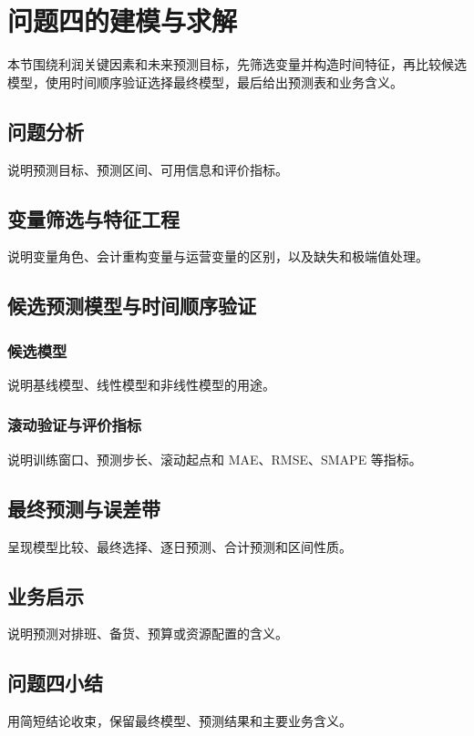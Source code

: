 \section{问题四的建模与求解}

本节围绕利润关键因素和未来预测目标，先筛选变量并构造时间特征，再比较候选模型，使用时间顺序验证选择最终模型，最后给出预测表和业务含义。

\subsection{问题分析}
说明预测目标、预测区间、可用信息和评价指标。

\subsection{变量筛选与特征工程}
说明变量角色、会计重构变量与运营变量的区别，以及缺失和极端值处理。

\subsection{候选预测模型与时间顺序验证}
\subsubsection{候选模型}
说明基线模型、线性模型和非线性模型的用途。

\subsubsection{滚动验证与评价指标}
说明训练窗口、预测步长、滚动起点和 MAE、RMSE、SMAPE 等指标。

\subsection{最终预测与误差带}
呈现模型比较、最终选择、逐日预测、合计预测和区间性质。

\subsection{业务启示}
说明预测对排班、备货、预算或资源配置的含义。

\subsection{问题四小结}
用简短结论收束，保留最终模型、预测结果和主要业务含义。
